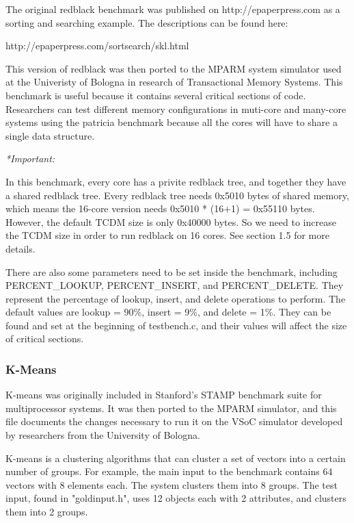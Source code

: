 \documentclass{article}
\begin{document}
The original redblack benchmark was published on http://epaperpress.com
as a sorting and searching example. The descriptions can be found here:

http://epaperpress.com/sortsearch/skl.html

This version of redblack was then ported to the MPARM system simulator used at 
the Univeristy of Bologna in research of Transactional Memory Systems. This
benchmark is useful because it contains several critical sections of code. 
Researchers can test different memory configurations in muti-core and many-core 
systems using the patricia benchmark because all the cores will have to share a 
single data structure. 

\vspace{2mm}
\emph{*Important:} 

In this benchmark, every core has a privite redblack tree, and together they 
have a shared redblack tree. Every redblack tree needs 0x5010 bytes of shared 
memory, which means the 16-core version needs 0x5010 * (16+1) = 0x55110 bytes. 
However, the default TCDM size is only 0x40000 bytes. 
So we need to increase the TCDM size in order to run redblack on 16 cores. 
See section 1.5 for more details.

There are also some parameters need to be set inside the benchmark, including 
 PERCENT\_LOOKUP, PERCENT\_INSERT, and PERCENT\_DELETE. They 
represent the percentage of lookup, insert, and delete operations to perform.
The default values are lookup = 90\%, insert = 9\%, and 
delete = 1\%. They can be found and set at the beginning of testbench.c,
and their values will affect the size of critical sections. 


\subsubsection{K-Means}

K-means was originally included in Stanford's STAMP benchmark suite for 
multiprocessor systems.  It was then ported to the MPARM simulator, and this
file documents the changes necessary to run it on the VSoC simulator developed
by researchers from the University of Bologna. 

K-means is a clustering algorithms that can cluster a set of vectors into a 
certain number of groups.  For example, the main input to the benchmark
contains 64 vectors with 8 elements each. The system clusters them into 8
groups.  The test input, found in "goldinput.h", uses 12 objects each with 
2 attributes, and clusters them into 2 groups. 
\end{document}
